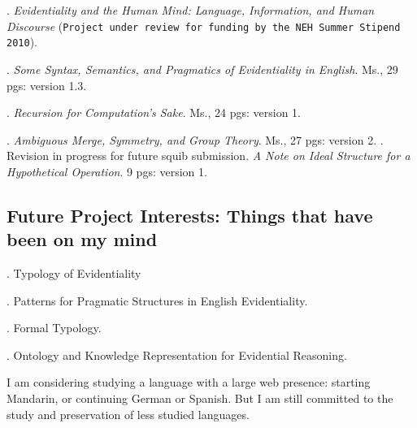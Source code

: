 \documentclass[11pt]{article}
\begin{document}
\ex. \textsl{Evidentiality and the Human Mind: Language, Information, and Human Discourse} (\texttt{Project under review for funding by the NEH Summer Stipend 2010}). 

\ex. \textsl{Some Syntax, Semantics, and Pragmatics of Evidentiality in English}. Ms., 29 pgs: version 1.3. 

\ex. \textsl{Recursion for Computation's Sake}. Ms., 24 pgs: version 1.

\ex. \textsl{Ambiguous Merge, Symmetry, and Group Theory}. Ms., 27 pgs: version 2. 
\a.  \small{Revision in progress for future squib submission. \textsl{A Note on Ideal Structure for a Hypothetical Operation}. 9 pgs: version 1}.

\subsection{Future Project Interests: Things that have been on my mind}
\ex. Typology of Evidentiality

\ex. Patterns for Pragmatic Structures in English Evidentiality. 

\ex. Formal Typology.

\ex. Ontology and Knowledge Representation for Evidential Reasoning.

I am considering studying a language with a large web presence: starting Mandarin, or continuing German or Spanish. But I am still committed to the study and preservation of less studied languages.  
\end{document}

